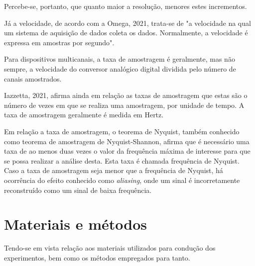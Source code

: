 \documentclass[
	12pt,				
	oneside,			
	a4paper,			
	english,			
	brazil,			
	]{abntex2ppgsi}
\begin{document}
Percebe-se, portanto, que quanto maior a resolução, menores estes incrementos. 

Já a velocidade, de acordo com a Omega, 2021, trata-se de "a velocidade na qual um sistema de aquisição de dados coleta os dados. Normalmente, a velocidade é expressa em amostras por segundo". 

Para dispositivos multicanais, a taxa de amostragem é geralmente, mas não sempre, a velocidade do conversor analógico digital dividida pelo número de canais amostrados. 

Iazzetta, 2021, afirma ainda em relação as taxas de amostragem que estas são o número de vezes em que se realiza uma amostragem, por unidade de tempo. A taxa de amostragem geralmente é medida em Hertz. 



Em relação a taxa de amostragem, o teorema de Nyquist, também conhecido como teorema de amostragem de Nyquist-Shannon, afirma que é necessário uma taxa de ao menos duas vezes o valor da frequência máxima de interesse para que se possa realizar a análise desta. Esta taxa é chamada frequência de Nyquist. Caso a taxa de amostragem seja menor que a frequência de Nyquist, há ocorrência do efeito conhecido como \textit{aliasing}, onde um sinal é incorretamente reconstruído como um sinal de baixa frequência.




\chapter{Materiais e métodos}


Tendo-se em vista relação aos materiais utilizados para condução dos experimentos, bem como os métodos empregados para tanto.
\end{document}
